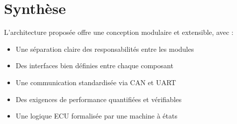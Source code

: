 \section{Synthèse}

L'architecture proposée offre une conception modulaire et extensible, avec :
\begin{itemize}
    \item Une séparation claire des responsabilités entre les modules
    \item Des interfaces bien définies entre chaque composant
    \item Une communication standardisée via CAN et UART
    \item Des exigences de performance quantifiées et vérifiables
    \item Une logique ECU formalisée par une machine à états
\end{itemize}
